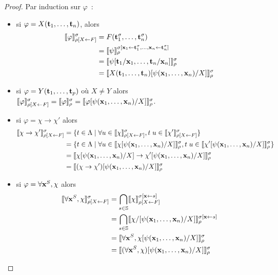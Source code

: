 \documentclass{article}
\begin{document}
\begin{proof}
  Par induction sur $\varphi$~:
  \begin{itemize}
  \item si $\varphi = X(\mathbf{t}_1,\ldots,\mathbf{t}_n)$, alors
    \begin{align*}
      \llbracket \varphi \rrbracket_{\rho[X\leftarrow F]}^\sigma &= F(\mathbf{t}_1^\sigma,\ldots,\mathbf{t}_n^\sigma) \\
      &= \llbracket \psi \rrbracket_\rho^{\sigma[\mathbf{x}_1\leftarrow \mathbf{t}_1^\sigma,\ldots,\mathbf{x}_n\leftarrow \mathbf{t}_n^\sigma]} \\
      &= \llbracket \psi[\mathbf{t}_1/\mathbf{x}_1,\ldots,\mathbf{t}_n/\mathbf{x}_n] \rrbracket_\rho^\sigma\\
      &= \llbracket X(\mathbf{t}_1,\ldots,\mathbf{t}_n)[\psi(\mathbf{x}_1,\ldots,\mathbf{x}_n)/X] \rrbracket_\rho^\sigma
    \end{align*}
  \item si $\varphi = Y(\mathbf{t}_1,\ldots,\mathbf{t}_p)$ où $X\neq Y$ alors $\llbracket \varphi \rrbracket_{\rho[X\leftarrow F]}^\sigma = \llbracket \varphi \rrbracket_\rho^\sigma = \llbracket \varphi[\psi(\mathbf{x}_1,\ldots,\mathbf{x}_n)/X] \rrbracket_\rho^\sigma$.
  \item si $\varphi = \chi \to \chi'$ alors
    \begin{align*}
      \llbracket \chi\to\chi' \rrbracket_{\rho[X\leftarrow F]}^\sigma &= \{t\in\Lambda\mid \forall u \in \llbracket \chi \rrbracket_{\rho[X\leftarrow F]}^\sigma, t\;u\in \llbracket \chi' \rrbracket_{\rho[X\leftarrow F]}^\sigma\}\\
      &= \{t\in\Lambda\mid \forall u \in \llbracket \chi[\psi(\mathbf{x}_1,\ldots,\mathbf{x}_n)/X] \rrbracket_\rho^\sigma, t\;u\in\llbracket \chi'[\psi(\mathbf{x}_1,\ldots,\mathbf{x}_n)/X] \rrbracket_\rho^\sigma\}\\
      &= \llbracket \chi[\psi(\mathbf{x}_1,\ldots,\mathbf{x}_n)/X] \to \chi'[\psi(\mathbf{x}_1,\ldots,\mathbf{x}_n)/X] \rrbracket_\rho^\sigma\\
      &= \llbracket (\chi\to\chi')[\psi(\mathbf{x}_1,\ldots,\mathbf{x}_n)/X] \rrbracket_\rho^\sigma
    \end{align*}
  \item si $\varphi = \forall \mathbf{x}^S, \chi$ alors
    \begin{align*}
      \llbracket \forall \mathbf{x}^S, \chi \rrbracket_{\rho[X\leftarrow F]}^\sigma &= \bigcap_{s\in\mathbb{S}}\llbracket \chi \rrbracket_{\rho[X\leftarrow F]}^{\sigma[\mathbf{x}\leftarrow s]}\\
      &= \bigcap_{s\in\mathbb{S}}\llbracket \chi/[\psi(\mathbf{x}_1,\ldots,\mathbf{x}_n)/X] \rrbracket_\rho^{\sigma[\mathbf{x}\leftarrow s]}\\
      &= \llbracket \forall \mathbf{x}^S, \chi[\psi(\mathbf{x}_1,\ldots,\mathbf{x}_n)/X] \rrbracket_\rho^\sigma\\
      &= \llbracket (\forall \mathbf{x}^S, \chi)[\psi(\mathbf{x}_1,\ldots,\mathbf{x}_n)/X] \rrbracket_\rho^\sigma
    \end{align*}

\end{itemize}
\end{proof}
\end{document}
